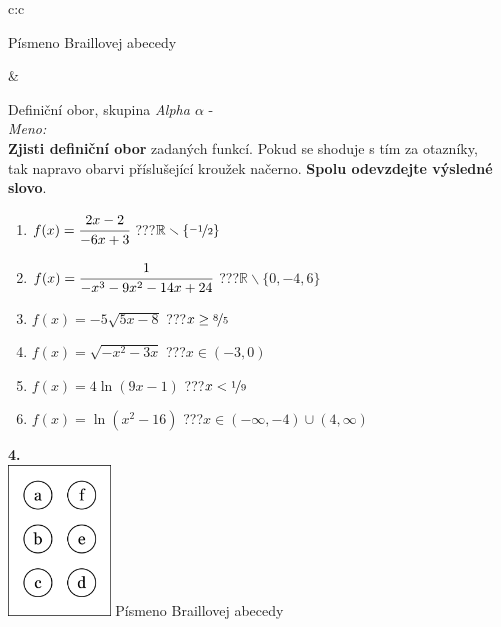 \documentclass[10pt]{report}
\begin{document}
\begin{tabular}{c:c}
\begin{minipage}[c][99mm][t]{0.49\linewidth}
\begin{center}
\begin{minipage}{0.20\linewidth}
\begin{center}
{\small Písmeno Braillovej abecedy}
\end{center}
\end{minipage}
\end{center}
\end{minipage}
&
\begin{minipage}[c][99mm][t]{0.49\linewidth}
\begin{center}
\vspace{7mm}
{\huge Definiční obor, skupina \textit{Alpha $\alpha$} -}\\[4.5mm]
\textit{Meno:}\phantom{xxxxxxxxxxxxxxxxxxxxxxxxxxxxxxxxxxxxxxxxxxxxxxxxxxxxxxxxxxxxxxxxx}\\[3.5mm]
\textbf{Zjisti definiční obor} zadaných funkcí. Pokud se shoduje s tím za otazníky,\\tak napravo obarvi příslušející kroužek načerno. \textbf{Spolu odevzdejte výsledné slovo}.\\[3mm]
\begin{minipage}{0.77\linewidth}
\begin{center}
\begin{varwidth}{\textwidth}
\begin{enumerate}
\normalsize
\item $f(x)=\cfrac{2x-2}{-6x+3}$\quad \dotfill\; ???\;\dotfill \quad $\mathbb{R}\smallsetminus\{\nicefrac{-1}{2}\}$
\item $f(x)=\cfrac{1}{-x^3-9x^2-14x+24}$\quad \dotfill\; ???\;\dotfill \quad $\mathbb{R}\smallsetminus\{0,-4,6\}$
\item $f(x)=-5\sqrt{5x-8}$\quad \dotfill\; ???\;\dotfill \quad $x\geq\nicefrac{8}{5}$
\item $f(x)=\sqrt{-x^2-3x}$\quad \dotfill\; ???\;\dotfill \quad $x\in(-3 , 0)$
\item $f(x)=4\ln{(9x-1)}$\quad \dotfill\; ???\;\dotfill \quad $x<\nicefrac{1}{9}$
\item $f(x)=\ln{(x^2-16)}$\quad \dotfill\; ???\;\dotfill \quad $x\in(-\infty , -4)\cup(4 , \infty)$
\end{enumerate}
\end{varwidth}
\end{center}
\end{minipage}
\begin{minipage}{0.20\linewidth}
\begin{center}
{\Huge\bfseries 4.} \\[2mm]
\includegraphics[height=40mm]{../images/braille.png}
{\small Písmeno Braillovej abecedy}
\end{center}
\end{minipage}
\end{center}
\end{minipage}
%
\end{tabular}
\end{document}
